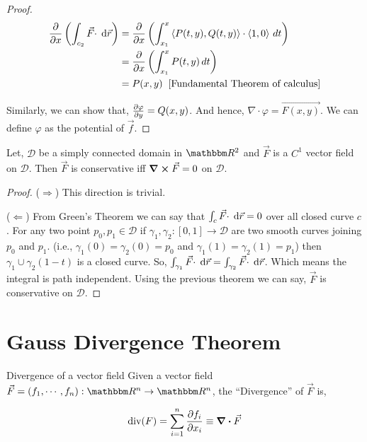 \documentclass[../Analysis-3]{subfiles}
\begin{document}
\begin{proof}
    \begin{align*}
        \pdv{x} \left(\int_{c_2} {\vec{F} \cdot } \hspace{0.1cm} \dd {\vec{r}}\right) & = \pdv{x} \left( \int_{x_1}^x \left\langle {P(t,y)}, {Q(t,y)} \right\rangle \cdot \left\langle {1}, {0} \right\rangle \,d t \right) \\
                                                                 & = \pdv{x} \left( \int_{x_1}^x P(t,y) \,d t \right)                                \\
                                                                 & = P(x,y) \hspace{0.2cm} \text{[Fundamental Theorem of calculus]}
    \end{align*}

    Similarly, we can show that, $\pdv{\varphi}{y} = Q(x,y)$. And hence, $ \nabla \cdot \varphi = \vec{F(x,y)}$. We can define $\varphi$ as the potential of $\vec{f}$.
\end{proof}

\begin{Thm}{}{}
    Let, $\mathcal{D}$ be a simply connected domain in $\R^2$ and $\vec{F}$ is a $C^1$ vector field on $\mathcal{D}$. Then $\vec{F}$ is conservative iff $\curl \vec{F} = 0$ on $\mathcal{D}$.
\end{Thm}

\begin{proof}
    ($\Rightarrow$) This direction is trivial.

    \vspace{0.2cm}

    ($\Leftarrow$) From Green's Theorem we can say that $ \int_{c} {\vec{F} \cdot } \hspace{0.1cm} \dd {\vec{r}} = 0$ over all closed curve $c$. For any two point $p_0,p_1 \in \mathcal{D}$ if $\gamma_1, \gamma_2 : [0,1] \to \mathcal{D}$ are two smooth curves joining $p_0$ and $p_1$. (i.e., $\gamma_1(0) = \gamma_2 (0) = p_0$ and $\gamma_1(1) = \gamma_2(1) = p_1$) then $\gamma_1 \cup \gamma_2(1-t)$ is a closed curve. So, $ \int_{\gamma_1} {\vec{F} \cdot } \hspace{0.1cm} \dd {\vec{r}}  = \int_{\gamma_2} {\vec{F} \cdot } \hspace{0.1cm} \dd {\vec{r}}$. Which means the integral is path independent. Using the previous theorem we can say, $\vec{F}$ is conservative on $\mathcal{D}$.
\end{proof}

\section{Gauss Divergence Theorem}

\begin{Def}{Divergence of a vector field}{}
    \small  Given a vector field $\vec{F} = (f_1,\cdots, f_n) : \R^n \to \R^n $, the ``Divergence'' of $\vec{F}$ is,

    \[\text{div}(F) = \sum_{i=1}^{n} \pdv{f_i}{x_i} \equiv \div \vec{F}\]
\end{Def}
\end{document}
